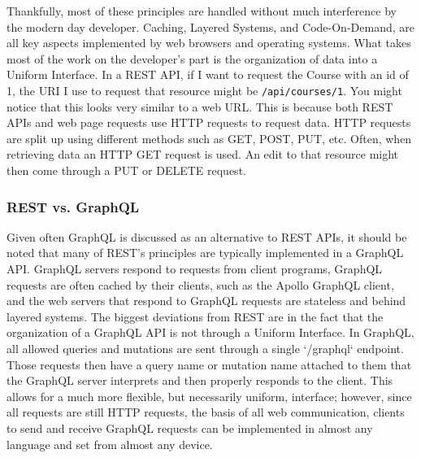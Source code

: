 Thankfully, most of these principles are handled without much interference by the modern day developer. Caching, Layered Systems, and Code-On-Demand, are all key aspects implemented by web browsers and operating systems.  What takes most of the work on the developer's part is the organization of data into a Uniform Interface. In a REST API, if I want to request the Course with an id of 1, the URI I use to request that resource might be \Verb"/api/courses/1".  You might notice that this looks very similar to a web URL.  This is because both REST APIs and web page requests use HTTP requests to request data. HTTP requests are split up using different methods such as GET, POST, PUT, etc. Often, when retrieving data an HTTP GET request is used.  An edit to that resource might then come through a PUT or DELETE request.

\subsubsection{REST vs. GraphQL}
Given often GraphQL is discussed as an alternative to REST APIs, it should be noted that many of REST's principles are typically implemented in a GraphQL API.  GraphQL servers respond to requests from client programs, GraphQL requests are often cached by their clients, such as the Apollo GraphQL client, and the web servers that respond to GraphQL requests are stateless and behind layered systems.  The biggest deviations from REST are in the fact that the organization of a GraphQL API is not through a Uniform Interface. In GraphQL, all allowed queries and mutations are sent through a single `/graphql` endpoint.  Those requests then have a query name or mutation name attached to them that the GraphQL server interprets and then properly responds to the client.  This allows for a much more flexible, but necessarily uniform, interface; however, since all requests are still HTTP requests, the basis of all web communication, clients to send and receive GraphQL requests can be implemented in almost any language and set from almost any device.
